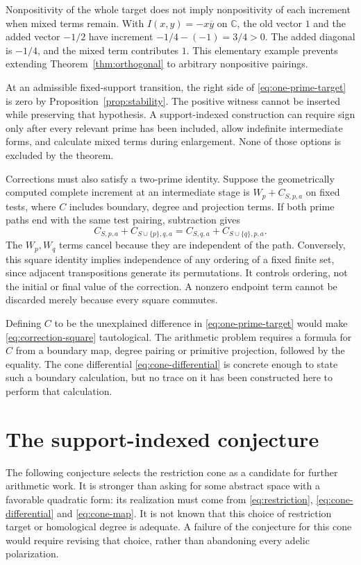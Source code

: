 \documentclass[11pt,letterpaper]{article}
\theoremstyle{definition}
\theoremstyle{remark}
\newcommand{\C}{\mathbb C}
\begin{document}
Nonpositivity of the whole target does not imply nonpositivity
of each increment when mixed terms remain. With
$I(x,y)=-x\overline y$ on $\C$, the old vector $1$ and the
added vector $-1/2$ have increment $-1/4-(-1)=3/4>0$.
The added diagonal is $-1/4$, and the mixed term contributes
$1$. This elementary example prevents extending
Theorem~\ref{thm:orthogonal} to arbitrary nonpositive pairings.

At an admissible fixed-support transition, the right side of
\eqref{eq:one-prime-target} is zero by
Proposition~\ref{prop:stability}. The positive witness cannot be
inserted while preserving that hypothesis. A support-indexed
construction can require sign only after every relevant prime
has been included, allow indefinite intermediate forms, and
calculate mixed terms during enlargement. None of those options
is excluded by the theorem.

Corrections must also satisfy a two-prime identity. Suppose the
geometrically computed complete increment at an intermediate
stage is $W_p+C_{S,p,a}$ on fixed tests, where $C$ includes
boundary, degree and projection terms. If both prime paths end
with the same test pairing, subtraction gives
\begin{equation}
 C_{S,p,a}+C_{S\cup\{p\},q,a}
       =C_{S,q,a}+C_{S\cup\{q\},p,a}.
 \label{eq:correction-square}
\end{equation}
The $W_p,W_q$ terms cancel because they are independent of
the path. Conversely, this square identity implies independence
of any ordering of a fixed finite set, since adjacent
transpositions generate its permutations. It controls ordering,
not the initial or final value of the correction. A nonzero
endpoint term cannot be discarded merely because every square
commutes.

Defining $C$ to be the unexplained difference in
\eqref{eq:one-prime-target} would make
\eqref{eq:correction-square} tautological. The arithmetic problem
requires a formula for $C$ from a boundary map, degree pairing
or primitive projection, followed by the equality. The cone
differential \eqref{eq:cone-differential} is concrete enough to
state such a boundary calculation, but no trace on it has been
constructed here to perform that calculation.

\section{The support-indexed conjecture}

The following conjecture selects the restriction cone as a candidate
for further arithmetic work. It is stronger than asking for some
abstract space with a favorable quadratic form: its realization
must come from \eqref{eq:restriction}, \eqref{eq:cone-differential}
and \eqref{eq:cone-map}. It is not known that this choice of
restriction target or homological degree is adequate. A failure
of the conjecture for this cone would require revising that choice,
rather than abandoning every adelic polarization.
\end{document}
